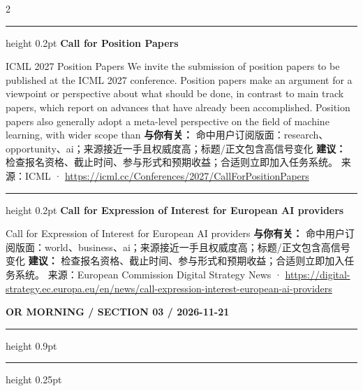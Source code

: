 \documentclass[10.5pt]{ctexart}
\begin{document}
\begin{multicols}{2}
\vspace{2mm}
\hrule height 0.2pt
\vspace{2mm}
{\large\bfseries Call for Position Papers}\par
ICML 2027 Position Papers We invite the submission of position papers to be published at the ICML 2027 conference. Position papers make an argument for a viewpoint or perspective about what should be done, in contrast to main track papers, which report on advances that have already been accomplished. Position papers also generally adopt a meta-level perspective on the field of machine learning, with wider scope than 
\textbf{与你有关：} 命中用户订阅版面：research、opportunity、ai；来源接近一手且权威度高；标题/正文包含高信号变化
\textbf{建议：} 检查报名资格、截止时间、参与形式和预期收益；合适则立即加入任务系统。
{\footnotesize\color{ormuted} 来源：ICML · \url{https://icml.cc/Conferences/2027/CallForPositionPapers}}
\vspace{2mm}
\hrule height 0.2pt
\vspace{2mm}
{\large\bfseries Call for Expression of Interest for European AI providers}\par
Call for Expression of Interest for European AI providers
\textbf{与你有关：} 命中用户订阅版面：world、business、ai；来源接近一手且权威度高；标题/正文包含高信号变化
\textbf{建议：} 检查报名资格、截止时间、参与形式和预期收益；合适则立即加入任务系统。
{\footnotesize\color{ormuted} 来源：European Commission Digital Strategy News · \url{https://digital-strategy.ec.europa.eu/en/news/call-expression-interest-european-ai-providers}}
\end{multicols}
\newpage
{\small\bfseries OR MORNING / SECTION 03 / 2026-11-21}
\vspace{2mm}
\hrule height 0.9pt
\vspace{1.5mm}
\hrule height 0.25pt
\vspace{4mm}
\end{document}
